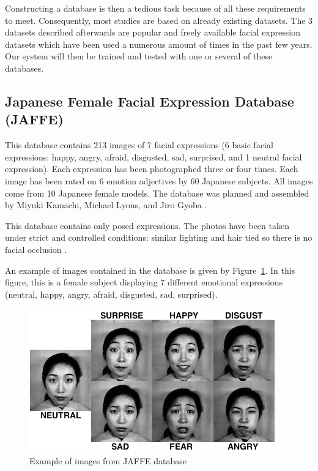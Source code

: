 \noindent Constructing a database is then a tedious task because of all these requirements to meet. Consequently, most studies are based on already existing datasets. The 3 datasets described afterwards are popular and freely available facial expression datasets which have been used a numerous amount of times in the past few years. Our system will then be trained and tested with one or several of these databases.
\newline

\subsection{Japanese Female Facial Expression Database (JAFFE)}

\vspace{\baselineskip}
\noindent This database contains 213 images of 7 facial expressions (6 basic facial expressions: happy, angry, afraid, disgusted, sad, surprised, and 1 neutral facial expression). Each expression has been photographed three or four times. Each image has been rated on 6 emotion adjectives by 60 Japanese subjects. All images come from 10 Japanese female models.  The database was planned and assembled by Miyuki Kamachi, Michael Lyons, and Jiro Gyoba \cite{JAFFE}.
\newline

\noindent This database contains only posed expressions. The photos have been taken under strict  and controlled conditions: similar lighting and hair tied so there is no facial occlusion \cite{BET12}. 
\newline

\noindent An example of images contained in the database is given by Figure~\ref{jaffe_7facialexpressions}. In this figure, this is a female subject displaying 7 different emotional expressions (neutral, happy, angry, afraid, disgusted, sad, surprised). 
\newline

\begin{figure}[!h]
\begin{center}
\noindent \includegraphics[scale=0.75]{figures/jaffe_7facialexpressions} 
\newline
\caption{Example of images from JAFFE database}
\label{jaffe_7facialexpressions}
\end{center} 
\end{figure}

